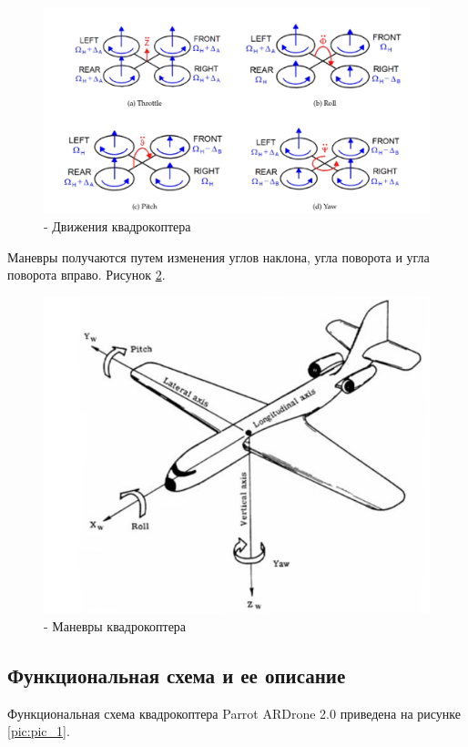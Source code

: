 \begin{figure}[H]
	\begin{center}
		\includegraphics[scale=0.4]{pics/kren}
		\caption{- Движения квадрокоптера} 
		\label{pic:pic_2} %
	\end{center}
\end{figure}
Маневры получаются путем изменения углов наклона, угла поворота и угла поворота вправо. Рисунок \ref{pic:pic_3}.\cite{Parrot}
\begin{figure}[H]
	\begin{center}
		\includegraphics[scale=0.4]{pics/sam}
		\caption{- Маневры квадрокоптера} 
		\label{pic:pic_3} %
	\end{center}
\end{figure}

\subsection{Функциональная схема и ее описание}
Функциональная схема квадрокоптера Parrot ARDrone 2.0 приведена на рисунке \ref{pic:pic_1}.

